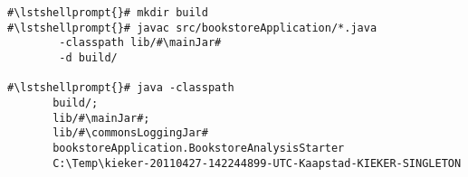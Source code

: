 \begin{lstlisting}[caption=Commands to compile and run the analysis under Windows,label=lst:bookstoreAnalysisStarterWin]
#\lstshellprompt{}# mkdir build
#\lstshellprompt{}# javac src/bookstoreApplication/*.java
        -classpath lib/#\mainJar#
        -d build/

#\lstshellprompt{}# java -classpath 
       build/;
       lib/#\mainJar#;
       lib/#\commonsLoggingJar#
       bookstoreApplication.BookstoreAnalysisStarter 
       C:\Temp\kieker-20110427-142244899-UTC-Kaapstad-KIEKER-SINGLETON
\end{lstlisting}	
